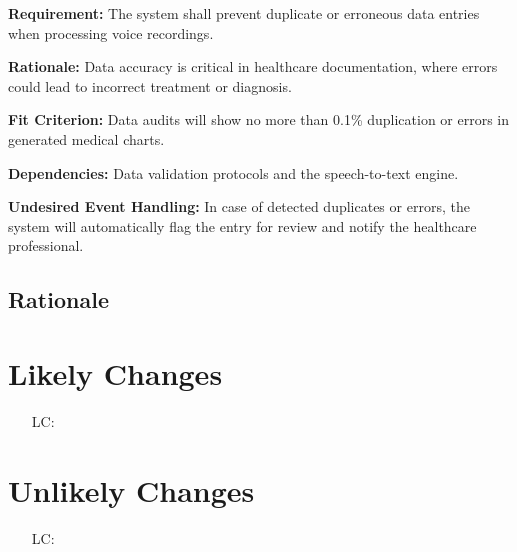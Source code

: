 \documentclass[12pt]{article}
\newcounter{lcnum} %
\begin{document}
\begin{itemize}
    \textbf{Requirement:} The system shall prevent duplicate or erroneous data entries when processing voice recordings.  
  
    \textbf{Rationale:} Data accuracy is critical in healthcare documentation, where errors could lead to incorrect treatment or diagnosis.  
  
    \textbf{Fit Criterion:} Data audits will show no more than 0.1\% duplication or errors in generated medical charts.  
  
    \textbf{Dependencies:} Data validation protocols and the speech-to-text engine.  
  
    \textbf{Undesired Event Handling:} In case of detected duplicates or errors, the system will automatically flag the entry for review and notify the healthcare professional.

\end{itemize}

\subsection{Rationale}


\section{Likely Changes}    

\noindent \begin{itemize}

\item[LC\refstepcounter{lcnum}\thelcnum\label{LC_meaningfulLabel}:] 

\end{itemize}

\section{Unlikely Changes}    

\noindent \begin{itemize}

\item[LC\refstepcounter{lcnum}\thelcnum\label{LC_meaningfulLabel}:] 

\end{itemize}
\end{document}
